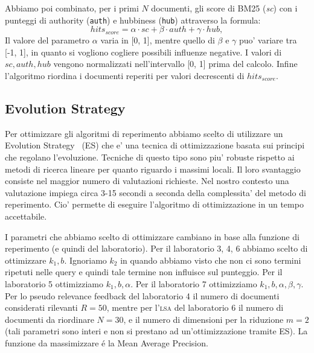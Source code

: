 Abbiamo poi combinato, per i primi $N$ documenti, gli score di BM25 (\textit{sc}) con i punteggi di authority (\texttt{auth}) e hubbiness (\texttt{hub}) attraverso la formula:
\[ hits_{score} =  \alpha \cdot sc + \beta \cdot auth + \gamma \cdot hub,\]
Il valore del parametro $\alpha$ varia in [0, 1],  mentre quello di $\beta$ e $\gamma$ puo' variare tra [-1, 1], in quanto si vogliono cogliere possibili influenze negative. I valori di $sc, auth, hub$ vengono normalizzati nell'intervallo [0, 1] prima del calcolo. 
Infine l'algoritmo riordina i documenti reperiti per valori decrescenti di $hits_{score}$.


\subsection{Evolution Strategy}
\label{sec:es}

Per ottimizzare gli algoritmi di reperimento abbiamo scelto di utilizzare un Evolution Strategy~\cite{back1996evolutionary} (ES) che e' una tecnica di ottimizzazione basata sui principi che regolano l'evoluzione. Tecniche di questo tipo sono piu' robuste rispetto ai metodi di ricerca lineare per quanto riguardo i massimi locali. Il loro svantaggio consiste nel maggior numero di valutazioni richieste. Nel nostro contesto una valutazione impiega circa 3-15 secondi a seconda della complessita' del metodo di reperimento. Cio' permette di eseguire l'algoritmo di ottimizzazione in un tempo accettabile.

I parametri che abbiamo scelto di ottimizzare cambiano in base alla funzione di reperimento (e quindi del laboratorio). Per il laboratorio 3, 4, 6 abbiamo scelto di ottimizzare $k_1, b$. Ignoriamo $k_2$ in quando abbiamo visto che non ci sono termini ripetuti nelle query e quindi tale termine non influisce sul punteggio. Per il laboratorio 5 ottimizziamo $k_1, b, \alpha$. Per il laboratorio 7 ottimizziamo $k_1, b, \alpha, \beta, \gamma$. Per lo pseudo relevance feedback del laboratorio 4 il numero di documenti considerati rilevanti $R = 50$, mentre per l'\textsc{lsa} del laboratorio 6 il numero di documenti da riordinare $N = 30$, e il numero di dimensioni per la riduzione $m=2$ (tali parametri sono interi e non si prestano ad un'ottimizzazione tramite ES). La funzione da massimizzare \'e la Mean Average Precision.

